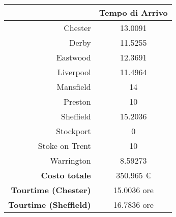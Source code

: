 
		\begin{table}[H]
			\small
			\centering
			\label{table:instance_4_arrival}
			\begin{tabular}{rc}

				\toprule
				& Tempo di Arrivo \\

				\midrule
				Chester & 13.0091 \\
				Derby  & 11.5255 \\
				Eastwood & 12.3691 \\
				Liverpool  & 11.4964 \\
				Mansfield & 14 \\
				Preston & 10 \\
				Sheffield & 15.2036 \\
				Stockport & 0 \\
				Stoke on Trent & 10 \\
				Warrington & 8.59273 \\

				\midrule
				\textbf{Costo totale} & 350.965 € \\
				\textbf{Tourtime (Chester)} & 15.0036 ore \\
				\textbf{Tourtime (Sheffield)} & 16.7836 ore \\
				\bottomrule
			\end{tabular}
		\end{table}

